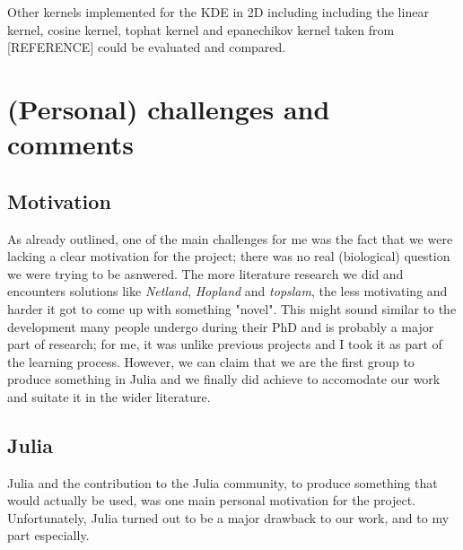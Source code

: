 \documentclass[journal, a4paper]{IEEEtran}
\begin{document}
Other kernels implemented for the KDE in 2D including including the linear kernel, cosine kernel, tophat kernel and epanechikov kernel taken from [REFERENCE] could be evaluated and compared. 


\section{(Personal) challenges and comments}\label{personalchallenges}


\subsection{Motivation}
As already outlined, one of the main challenges for me was the fact that we were lacking a clear motivation for the project; there was no real (biological) question we were trying to be asnwered. The more literature research we did and encounters solutions like \textit{Netland}, \textit{Hopland} and \textit{topslam}, the less motivating and harder it got to come up with something "novel". This might sound similar to the development many people undergo during their PhD and is probably a major part of research; for me, it was unlike previous projects and I took it as part of the learning process.
However, we can claim that we are the first group to produce something in Julia and we finally did achieve to accomodate our work and suitate it in the wider literature. 

\subsection{Julia}
Julia and the contribution to the Julia community, to produce something that would actually be used, was one main personal motivation for the project. Unfortunately, Julia turned out to be a major drawback to our work, and to my part especially.

\end{document}
